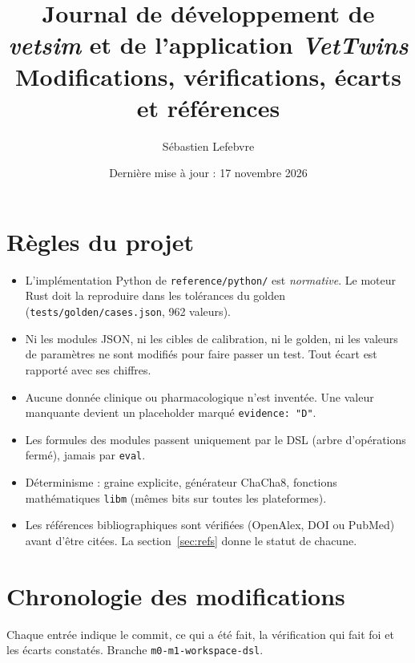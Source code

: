 \documentclass[11pt,a4paper]{article}
\title{Journal de développement de \emph{vetsim} et de l'application \emph{VetTwins}\\[0.3em]
\large Modifications, vérifications, écarts et références}
\author{Sébastien Lefebvre}
\date{Dernière mise à jour : 17 novembre 2026}
\begin{document}
\maketitle

\begin{center}
\end{center}

\section{Règles du projet}
\begin{itemize}
  \item L'implémentation Python de \texttt{reference/python/} est \emph{normative}. Le moteur Rust doit la reproduire dans les tolérances du golden (\texttt{tests/golden/cases.json}, 962 valeurs).
  \item Ni les modules JSON, ni les cibles de calibration, ni le golden, ni les valeurs de paramètres ne sont modifiés pour faire passer un test. Tout écart est rapporté avec ses chiffres.
  \item Aucune donnée clinique ou pharmacologique n'est inventée. Une valeur manquante devient un placeholder marqué \texttt{evidence: "D"}.
  \item Les formules des modules passent uniquement par le DSL (arbre d'opérations fermé), jamais par \texttt{eval}.
  \item Déterminisme : graine explicite, générateur ChaCha8, fonctions mathématiques \texttt{libm} (mêmes bits sur toutes les plateformes).
  \item Les références bibliographiques sont vérifiées (OpenAlex, DOI ou PubMed) avant d'être citées. La section~\ref{sec:refs} donne le statut de chacune.
\end{itemize}

\section{Chronologie des modifications}
Chaque entrée indique le commit, ce qui a été fait, la vérification qui fait foi et les écarts constatés. Branche \texttt{m0-m1-workspace-dsl}.
\end{document}
